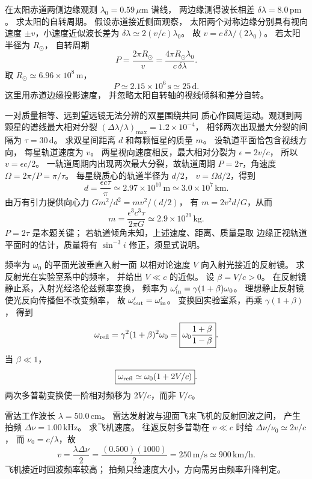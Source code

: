 在太阳赤道两侧边缘观测
$\lambda_0=0.59\,\mu\mathrm m$ 谱线，
两边缘测得波长相差
$\delta\lambda=8.0\,\mathrm{pm}$。
求太阳的自转周期。
\exsolution
假设赤道接近侧面观察，
太阳两个对称边缘分别具有视向速度
$\pm v$，小速度近似波长差为
$\delta\lambda\simeq2(v/c)\lambda_0$。
故 $v=c\,\delta\lambda/(2\lambda_0)$。
若太阳半径为 $R_\odot$，
自转周期
\[
 P=\frac{2\pi R_\odot}{v}
 =\boxed{\frac{4\pi R_\odot\lambda_0}
 {c\,\delta\lambda}}.
\]
取 $R_\odot\simeq6.96\times10^8\,\mathrm m$，
\[
 \boxed{P\simeq2.15\times10^6\,\mathrm s
 \simeq25\,\mathrm d}.
\]
\excheck 这里用赤道边缘投影速度，
并忽略太阳自转轴的视线倾斜和差分自转。

一对质量相等、远到望远镜无法分辨的双星围绕共同
质心作圆周运动。观测到两颗星的谱线最大相对分裂
$(\Delta\lambda/\lambda)_{\max}
=1.2\times10^{-4}$，
相邻两次出现最大分裂的间隔为
$\tau=30\,\mathrm d$。
求双星间距离 $d$ 和每颗恒星的质量 $m$。
\exsolution
设轨道平面恰包含视线方向，
每星轨道速度为 $v$。
两星视向速度相反，最大相对分裂为
$\epsilon=2v/c$，
所以 $v=\epsilon c/2$。
一轨道周期内出现两次最大分裂，故轨道周期
$P=2\tau$，角速度
$\Omega=2\pi/P=\pi/\tau$。
每星绕质心的轨道半径为 $d/2$，
$v=\Omega d/2$，得到
\[
 \boxed{d=\frac{\epsilon c\tau}{\pi}
 \simeq2.97\times10^{10}\,\mathrm m
 \simeq3.0\times10^7\,\mathrm{km}}.
\]
由万有引力提供向心力
$Gm^2/d^2=m v^2/(d/2)$，
有 $m=2v^2d/G$，从而
\[
 \boxed{m=\frac{\epsilon^3c^3\tau}{2\pi G}
 \simeq2.9\times10^{29}\,\mathrm{kg}}.
\]
\excheck $P=2\tau$ 是本题关键；
若轨道倾角未知，上述速度、距离、质量是取
边缘正视轨道平面时的估计，质量将有 $\sin^{-3}i$
修正，须显式说明。

频率为 $\omega_0$ 的平面光波垂直入射一面
以相对论速度 $V$ 向入射光接近的反射镜。
求反射光在实验室系中的频率，
并给出 $V\ll c$ 的近似。
\exsolution
设 $\beta=V/c>0$。
在反射镜静止系，入射光经洛伦兹频率变换，
频率为
$\omega_{\rm in}'=\gamma(1+\beta)\omega_0$。
理想静止反射镜使光反向传播但不改变频率，
故 $\omega_{\rm out}'=\omega_{\rm in}'$。
变换回实验室系，再乘
$\gamma(1+\beta)$，
得到
\[
 \omega_{\rm refl}
 =\gamma^2(1+\beta)^2\omega_0
 =\boxed{\omega_0\frac{1+\beta}{1-\beta}}.
\]
当 $\beta\ll1$，
\[
 \boxed{\omega_{\rm refl}\simeq\omega_0(1+2V/c)}.
\]
\excheck 两次多普勒变换使一阶相对频移为
$2V/c$，而非 $V/c$。

雷达工作波长 $\lambda=50.0\,\mathrm{cm}$。
雷达发射波与迎面飞来飞机的反射回波之间，
产生拍频 $\Delta\nu=1.00\,\mathrm{kHz}$。
求飞机速度。
\exsolution
往返反射多普勒在 $v\ll c$ 时给
$\Delta\nu/\nu_0\simeq2v/c$，
而 $\nu_0=c/\lambda$，故
\[
 \boxed{v=\frac{\lambda\Delta\nu}{2}
 =\frac{(0.500)(1000)}2
 =250\,\mathrm{m/s}
 \simeq900\,\mathrm{km/h}}.
\]
\excheck 飞机接近时回波频率较高；
拍频只给速度大小，方向需另由频率升降判定。

